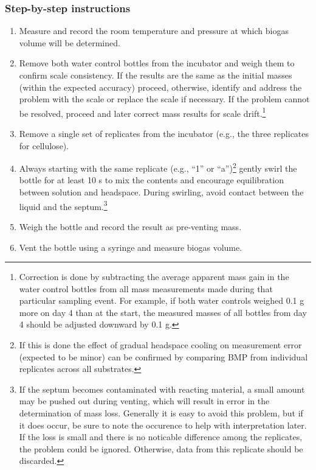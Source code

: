 \documentclass[]{article}
\begin{document}
\subsubsection{Step-by-step instructions}
\begin{enumerate}
    \item Measure and record the room temperature and pressure at which biogas volume will be determined.
    \item Remove both water control bottles from the incubator and weigh them to confirm scale consistency. 
      If the results are the same as the initial masses (within the expected accuracy) proceed, otherwise, identify and address the problem with the scale or replace the scale if necessary.
      If the problem cannot be resolved, proceed and later correct mass results for scale drift.\footnote{
        Correction is done by subtracting the average apparent mass gain in the water control bottles from all mass measurements made during that particular sampling event. 
        For example, if both water controls weighed 0.1 g more on day 4 than at the start, the measured masses of all bottles from day 4 should be adjusted downward by 0.1 g.
      }
    \item Remove a single set of replicates from the incubator (e.g., the three replicates for cellulose).
    \item Always starting with the same replicate (e.g., ``1'' or ``a'')\footnote{
        If this is done the effect of gradual headspace cooling on measurement error (expected to be minor) can be confirmed by comparing BMP from individual replicates across all substrates.
      } gently swirl the bottle for at least 10 s to mix the contents and encourage  equilibration between solution and headspace. 
      During swirling, avoid contact between the liquid and the septum.\footnote{
        If the septum becomes contaminated with reacting material, a small amount may be pushed out during venting, which will result in error in the determination of mass loss.
        Generally it is easy to avoid this problem, but if it does occur, be sure to note the occurence to help with interpretation later.
        If the loss is small and there is no noticable difference among the replicates, the problem could be ignored. 
        Otherwise, data from this replicate should be discarded.
      }
    \item Weigh the bottle and record the result as pre-venting mass.
    \item Vent the bottle using a syringe and measure biogas volume.

\end{enumerate}
\end{document}
